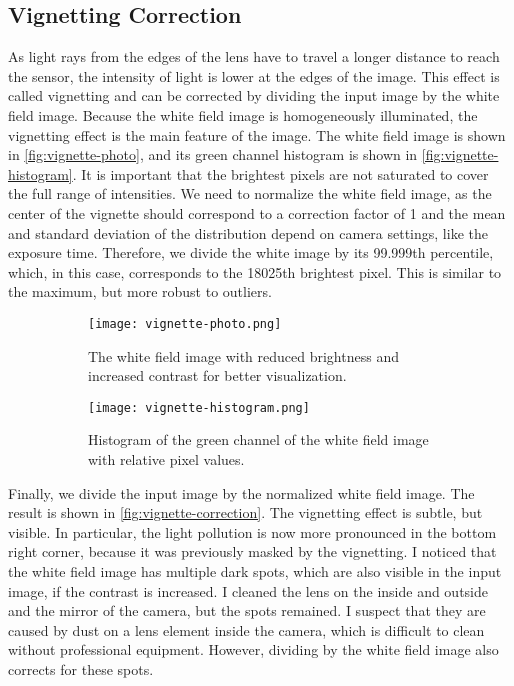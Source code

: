 \subsection{Vignetting Correction}
\label{sec:vignetting-correction}

As light rays from the edges of the lens have to travel a longer distance to reach the
sensor, the intensity of light is lower at the edges of the image. This effect is called
vignetting and can be corrected by dividing the input image by the white field image.
Because the white field image is homogeneously illuminated, the vignetting effect is the
main feature of the image. The white field image is shown in \autoref{fig:vignette-photo},
and its green channel histogram is shown in \autoref{fig:vignette-histogram}. It is
important that the brightest pixels are not saturated to cover the full range of
intensities. We need to normalize the white field image, as the center of the vignette
should correspond to a correction factor of 1 and the mean and standard deviation of the
distribution depend on camera settings, like the exposure time. Therefore, we divide the
white image by its 99.999th percentile, which, in this case, corresponds to the 18025th
brightest pixel. This is similar to the maximum, but more robust to outliers.

\begin{figure}[htbp]
  \centering
  \begin{subfigure}{.49\textwidth}
    \centering
    \texttt{[image: vignette-photo.png]}
    \caption{The white field image with reduced brightness and increased contrast for better visualization.}
    \label{fig:vignette-photo}
  \end{subfigure}%
  \hfill
  \begin{subfigure}{.49\textwidth}
    \centering
    \texttt{[image: vignette-histogram.png]}
    \caption{Histogram of the green channel of the white field image with relative pixel values.}
    \label{fig:vignette-histogram}
  \end{subfigure}
  \caption{}
\end{figure}

Finally, we divide the input image by the normalized white field image. The result is
shown in \autoref{fig:vignette-correction}. The vignetting effect is subtle, but visible.
In particular, the light pollution is now more pronounced in the bottom right corner,
because it was previously masked by the vignetting. I noticed that the white field image
has multiple dark spots, which are also visible in the input image, if the contrast is
increased. I cleaned the lens on the inside and outside and the mirror of the camera, but
the spots remained. I suspect that they are caused by dust on a lens element inside the
camera, which is difficult to clean without professional equipment. However, dividing by
the white field image also corrects for these spots.

